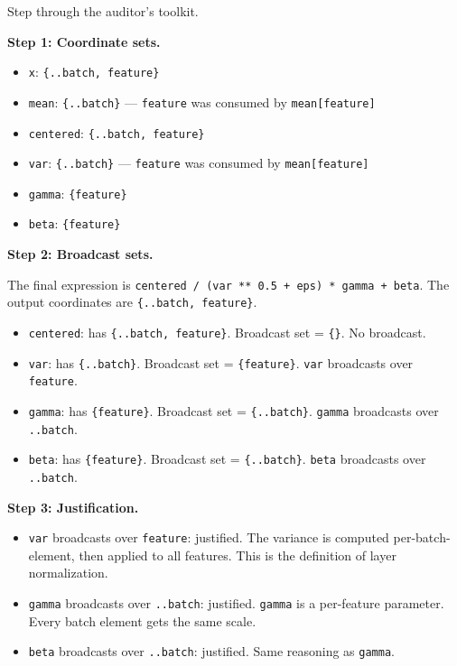 \documentclass[11pt,titlepage]{article}
\providecommand{\tightlist}{%
  \setlength{\itemsep}{0pt}\setlength{\parskip}{0pt}}
\begin{document}
Step through the auditor's toolkit.

\textbf{Step 1: Coordinate sets.}

\begin{itemize}
\tightlist
\item
  \texttt{x}: \texttt{\{..batch,\ feature\}}
\item
  \texttt{mean}: \texttt{\{..batch\}} --- \texttt{feature} was consumed
  by \texttt{mean{[}feature{]}}
\item
  \texttt{centered}: \texttt{\{..batch,\ feature\}}
\item
  \texttt{var}: \texttt{\{..batch\}} --- \texttt{feature} was consumed
  by \texttt{mean{[}feature{]}}
\item
  \texttt{gamma}: \texttt{\{feature\}}
\item
  \texttt{beta}: \texttt{\{feature\}}
\end{itemize}

\textbf{Step 2: Broadcast sets.}

The final expression is
\texttt{centered\ /\ (var\ **\ 0.5\ +\ eps)\ *\ gamma\ +\ beta}. The
output coordinates are \texttt{\{..batch,\ feature\}}.

\begin{itemize}
\tightlist
\item
  \texttt{centered}: has \texttt{\{..batch,\ feature\}}. Broadcast set =
  \texttt{\{\}}. No broadcast.
\item
  \texttt{var}: has \texttt{\{..batch\}}. Broadcast set =
  \texttt{\{feature\}}. \texttt{var} broadcasts over \texttt{feature}.
\item
  \texttt{gamma}: has \texttt{\{feature\}}. Broadcast set =
  \texttt{\{..batch\}}. \texttt{gamma} broadcasts over \texttt{..batch}.
\item
  \texttt{beta}: has \texttt{\{feature\}}. Broadcast set =
  \texttt{\{..batch\}}. \texttt{beta} broadcasts over \texttt{..batch}.
\end{itemize}

\textbf{Step 3: Justification.}

\begin{itemize}
\tightlist
\item
  \texttt{var} broadcasts over \texttt{feature}: justified. The variance
  is computed per-batch-element, then applied to all features. This is
  the definition of layer normalization.
\item
  \texttt{gamma} broadcasts over \texttt{..batch}: justified.
  \texttt{gamma} is a per-feature parameter. Every batch element gets
  the same scale.
\item
  \texttt{beta} broadcasts over \texttt{..batch}: justified. Same
  reasoning as \texttt{gamma}.
\end{itemize}
\end{document}
